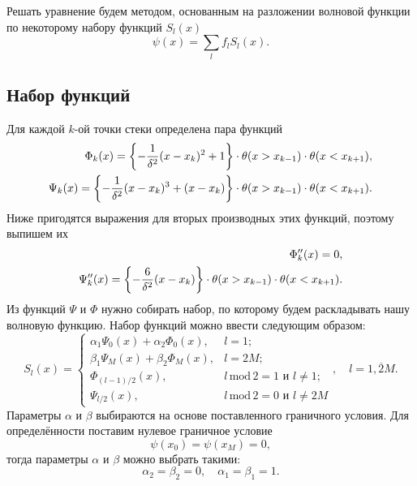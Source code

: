 \documentclass[10pt]{article}
\begin{document}
Решать уравнение будем методом, основанным на разложении волновой функции по некоторому набору функций $S_l(x)$
\begin{equation}
    \psi(x) = \sum\limits_{l} f_l S_l(x).
    \label{eq:decomp}
\end{equation}

\subsection{Набор функций}

Для каждой $k$-ой точки стеки определена пара функций
\begin{equation}
    \begin{split}
        \Phi_{k}(x) = \qty{-\dfrac{1}{\delta^2}(x-x_k)^2 + 1}\cdot \theta(x>x_{k-1}) \cdot \theta(x<x_{k+1}),\\
        \Psi_{k}(x) = \qty{- \dfrac{1}{\delta^2}(x-x_k)^3 + (x-x_k)} \cdot \theta(x>x_{k-1}) \cdot \theta(x<x_{k+1}).\\
    \end{split}
\end{equation}
Ниже пригодятся выражения для вторых производных этих функций, поэтому выпишем их
\begin{equation}
    \begin{split}
        \Phi^{\prime\prime}_{k}(x) = 0,\\
        \Psi^{\prime\prime}_{k}(x) = \qty{- \dfrac{6}{\delta^2}(x-x_k)} \cdot \theta(x>x_{k-1}) \cdot \theta(x<x_{k+1}).\\
    \end{split}
\end{equation}
Из функций $\Psi$ и $\Phi$ нужно собирать набор, по которому будем раскладывать нашу волновую функцию. Набор функций можно ввести следующим образом:
\begin{equation}
    S_l(x) =
    \begin{cases}
        \alpha_1 \Psi_0(x) + \alpha_2 \Phi_0(x), &l=1;\\
        \beta_1 \Psi_M(x) + \beta_2 \Phi_M(x), &l=2M;\\
         \Phi_{(l-1)/2}(x), &{l\,\textrm{mod}\,2 = 1\textrm{ и }l\ne 1};\\
        \Psi_{l/2}(x), &{l\,\textrm{mod}\,2 = 0\textrm{ и }l\ne 2M}
    \end{cases}
    ,\quad l = \overline{1, 2M}.
\end{equation}
Параметры $\alpha$ и $\beta$ выбираются на основе поставленного граничного условия. Для определённости поставим нулевое граничное условие
\begin{equation}
    \psi(x_0) = \psi(x_M) = 0,
\end{equation}
тогда параметры $\alpha$ и $\beta$ можно выбрать такими:
\begin{equation}
    \alpha_2=\beta_2=0,\quad \alpha_1=\beta_1=1.
\end{equation}
\end{document}
